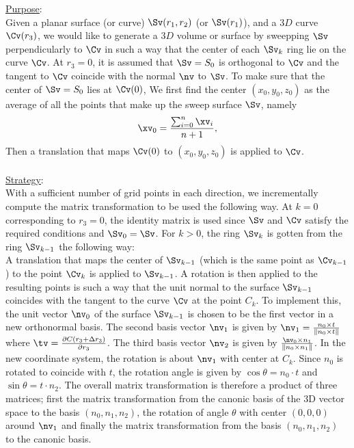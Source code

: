 \underline{\underline{Purpose}}:\\
Given a planar surface (or curve) $\Sv(r_1,r_2)$ (or $ \Sv(r_1)$), and a 
$3D$ curve $\Cv(r_3)$, we would like to 
generate a $3D$ volume or surface by sweepping $\Sv$ perpendicularly
to $\Cv$ in such a way that the center of each $\Sv_k$ ring lie on
the curve $\Cv$. At $r_3 = 0$, it is assumed that $\Sv = S_0$ is
orthogonal to $\Cv$ and the tangent to $\Cv$ coincide with the
normal $\nv $ to $\Sv$. To make sure that the center of $\Sv =
S_0$ lies at $\Cv(0)$, We first find the center $(x_0,y_0,z_0)$ as the
average of all the points that make up the sweep surface $\Sv$, namely
\[
\xv_0={\sum_{i=0}^n {\xv_i}\over n+1}, 
\]
Then a translation that maps $\Cv(0)$ to $(x_0,y_0,z_0)$ is applied 
to $\Cv$.
\\
\\
\underline{\underline{Strategy}}:\\
With a sufficient number of grid points in each direction, 
we incrementally compute the matrix transformation to be used the
following way. At $k=0$ corresponding to $r_3=0$, the identity matrix is
used since $\Sv$ and $\Cv$ satisfy the required conditions and $\Sv_0 = \Sv$. 
For $k>0$, the ring $\Sv_k$ is gotten from the ring $\Sv_{k-1}$
the following way:\\
A translation that maps the center of $\Sv_{k-1}$ (which is the same
point as $\Cv_{k-1}$) to the point $\Cv_k$ is applied to $\Sv_{k-1}$. A
rotation is then applied to the resulting points is such a way that the
unit normal to the surface $\Sv_{k-1}$ coincides with the tangent to the
curve $\Cv$ at the point $C_k$. To implement this,
the unit vector $\nv_0$  of the surface $\Sv_{k-1}$ is chosen to 
be the first vector in a new orthonormal basis. The second basis vector 
$\nv_1$ is given by $\nv_1 = {n_0\times t \over \| n_0\times t\|}$
where $\tv = {\partial C (r_3+\Delta r_3) \over \partial r_3}$. The third 
basis vector $\nv_2$ is given by $\nv_0\times n_1\over \|n_0\times n_1\|$. In the
new coordinate system, the rotation is about $\nv_1$ with center at
$C_k$. Since $n_0$ is rotated to coincide with $t$, the rotation angle
is given by $\cos \theta = n_0 \cdot t$ and $\sin \theta = t \cdot n_2$.
The overall matrix transformation is therefore a product of three matrices; 
first the matrix transformation from the canonic basis of the
3D vector space to the basis $(n_0, n_1, n_2)$, the rotation of angle
$\theta$ with center
$(0,0,0)$ around $\nv_1$ and finally the matrix transformation from the
basis $(n_0, n_1, n_2)$ to the canonic basis.\\
